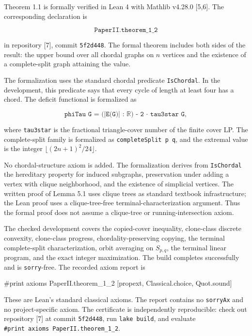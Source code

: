 \documentclass[
  11pt,
]{article}
\newenvironment{Shaded}{}{}
\newcommand{\NormalTok}[1]{#1}
\begin{document}
Theorem 1.1 is formally verified in Lean 4 with Mathlib v4.28.0
{[}5,6{]}. The corresponding declaration is

\[
\texttt{PaperII.theorem\_1\_2}
\]

in repository {[}7{]}, commit \texttt{5f2d448}. The formal theorem
includes both sides of the result: the upper bound over all chordal
graphs on \(n\) vertices and the existence of a complete-split graph
attaining the value.

The formalization uses the standard chordal predicate
\texttt{IsChordal}. In the development, this predicate says that every
cycle of length at least four has a chord. The deficit functional is
formalized as

\[
\texttt{phiTau G = (|E(G)| : ℝ) - 2 · tau3star G},
\]

where \texttt{tau3star} is the fractional triangle-cover number of the
finite cover LP. The complete-split family is formalized as
\texttt{completeSplit\ p\ q}, and the extremal value is the integer
\(\lfloor(2n+1)^2/24\rfloor\).

No chordal-structure axiom is added. The formalization derives from
\texttt{IsChordal} the hereditary property for induced subgraphs,
preservation under adding a vertex with clique neighborhood, and the
existence of simplicial vertices. The written proof of Lemma 5.1 uses
clique trees as standard textbook infrastructure; the Lean proof uses a
clique-tree-free terminal-characterization argument. Thus the formal
proof does not assume a clique-tree or running-intersection axiom.

The checked development covers the copied-cover inequality, clone-class
discrete convexity, clone-class progress, chordality-preserving copying,
the terminal complete-split characterization, orbit averaging on
\(S_{p,q}\), the terminal linear program, and the exact integer
maximization. The build completes successfully and is
\texttt{sorry}-free. The recorded axiom report is

\begin{Shaded}
\begin{Highlighting}[]
\NormalTok{\#print axioms PaperII.theorem\_1\_2}
\NormalTok{[propext, Classical.choice, Quot.sound]}
\end{Highlighting}
\end{Shaded}

These are Lean's standard classical axioms. The report contains no
\texttt{sorryAx} and no project-specific axiom. The certificate is
independently reproducible: check out repository {[}7{]} at commit
\texttt{5f2d448}, run \texttt{lake\ build}, and evaluate
\texttt{\#print\ axioms\ PaperII.theorem\_1\_2}.
\end{document}
